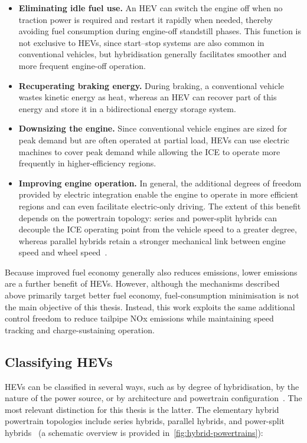 \begin{itemize}
  \item \textbf{Eliminating idle fuel use.} An \ac{HEV} can switch the engine off when no traction power is required and restart it rapidly when needed, thereby avoiding fuel consumption during engine-off standstill phases. This function is not exclusive to HEVs, since start--stop systems are also common in conventional vehicles, but hybridisation generally facilitates smoother and more frequent engine-off operation.
  \item \textbf{Recuperating braking energy.} During braking, a conventional vehicle wastes kinetic energy as heat, whereas an HEV can recover part of this energy and store it in a bidirectional energy storage system.
  \item \textbf{Downsizing the engine.} Since conventional vehicle engines are sized for peak demand but are often operated at partial load, HEVs can use electric machines to cover peak demand while allowing the \ac{ICE} to operate more frequently in higher-efficiency regions.
  \item \textbf{Improving engine operation.} In general, the additional degrees of freedom provided by electric integration enable the engine to operate in more efficient regions and can even facilitate electric-only driving. The extent of this benefit depends on the powertrain topology: series and power-split hybrids can decouple the \ac{ICE} operating point from the vehicle speed to a greater degree, whereas parallel hybrids retain a stronger mechanical link between engine speed and wheel speed~\cite{lin_progress_2024}.
\end{itemize}

Because improved fuel economy generally also reduces emissions, lower emissions are a further benefit of HEVs. However, although the mechanisms described above primarily target better fuel economy, fuel-consumption minimisation is not the main objective of this thesis. Instead, this work exploits the same additional control freedom to reduce tailpipe \ac{NOx} emissions while maintaining speed tracking and charge-sustaining operation.

\subsection{Classifying HEVs}
\acp{HEV} can be classified in several ways, such as by degree of hybridisation, by the nature of the power source, or by architecture and powertrain configuration~\cite{kebriaei_hybrid_2015}. The most relevant distinction for this thesis is the latter. The elementary hybrid powertrain topologies include series hybrids, parallel hybrids, and power-split hybrids~\cite{hofmann_hybridfahrzeuge_2023} (a schematic overview is provided in~\autoref{fig:hybrid-powertrains}):

